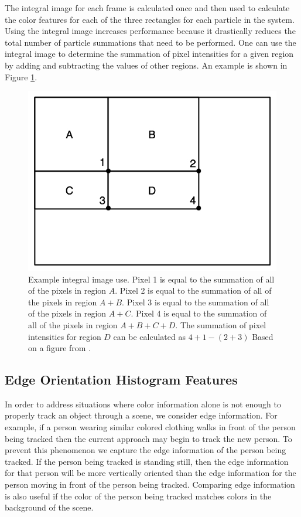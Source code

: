\documentclass[12pt]{article}
\begin{document}
The integral image for each frame is calculated once and then used to calculate the color features for each of the three rectangles for each particle in the system. Using the integral image increases performance because it drastically reduces the total number of particle summations that need to be performed. One can use the integral image to determine the summation of pixel intensities for a given region by adding and subtracting the values of other regions. An example is shown in Figure \ref{fig:integralimguse}.

 \begin{figure}[H]
\centering
\includegraphics[scale=.4]{img/IntegralImageUse.jpg}
\caption{Example integral image use. Pixel 1 is equal to the summation of all of the pixels in region $A$. Pixel 2 is equal to the summation of all of the pixels in region $A+B$. Pixel 3 is equal to the summation of all of the pixels in region $A+C$. Pixel 4 is equal to the summation of all of the pixels in region $A+B+C+D$. The summation of pixel intensities for region $D$ can be calculated as $4+1-(2+3)$  Based on a figure from \cite{facedetection}.}
\label{fig:integralimguse}
\end{figure}


\subsection{Edge Orientation Histogram Features}
\label{sec:edgehist}

In order to address situations where color information alone is not enough to properly track an object through a scene, we consider edge information. For example, if a person wearing similar colored clothing walks in front of the person being tracked then the current approach may begin to track the new person. To prevent this phenomenon we capture the edge information of the person being tracked. If the person being tracked is standing still, then the edge information for that person will be more vertically oriented than the edge information for the person moving in front of the person being tracked. Comparing edge information is also useful if the color of the person being tracked matches colors in the background of the scene. 
\end{document}
